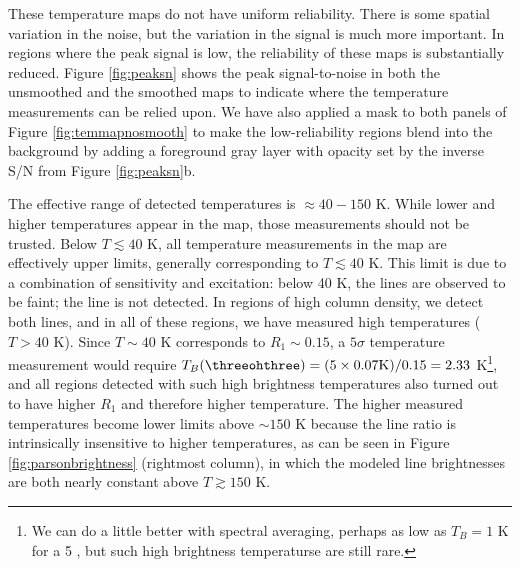 

These temperature maps do not have uniform reliability.  There is some spatial
variation in the noise, but the variation in the signal is much more important.
In regions where the peak signal is low, the reliability of these maps is
substantially reduced.  Figure \ref{fig:peaksn} shows the peak signal-to-noise
in both the unsmoothed and the smoothed maps to indicate where the temperature
measurements can be relied upon.  We have also applied a mask to both panels of
Figure \ref{fig:temmapnosmooth} to make the low-reliability regions blend into
the background by adding a foreground gray layer with opacity set by the
inverse S/N from Figure \ref{fig:peaksn}b.

The effective range of detected temperatures is $\approx40-150$ K. While lower
and higher temperatures appear in the map, those measurements should not be
trusted.  Below $T\lesssim40$ K, all temperature measurements in the map are
effectively upper limits, generally corresponding to $T\lesssim40$ K.  This
limit is due to a combination of sensitivity and excitation: below 40 K, the
\para lines are observed to be faint; the \threetwoone line is not detected.
In regions of high column density, we detect both lines, and in all of these
regions, we have measured high temperatures ($T>40$ K).  
Since $T\sim40$ K corresponds to $R_1\sim0.15$, a $5\sigma$ temperature
measurement would require $T_B(\threeohthree) = (5 \times 0.07 \mathrm{K}) /
0.15 = 2.33$ K\footnote{We can do a little better with spectral averaging,
perhaps as low as $T_B=1$ K for a 5 \kms, but such high brightness temperaturse
are still rare.}, and all regions detected with such high brightness
temperatures also turned out to have higher $R_1$ and therefore higher
temperature.
The higher measured temperatures
become lower limits above $\sim150$ K because the \para line ratio is
intrinsically insensitive to higher temperatures, as can be seen in Figure
\ref{fig:parsonbrightness} (rightmost column), in which the modeled line
brightnesses are both nearly constant above $T\gtrsim150$ K.


